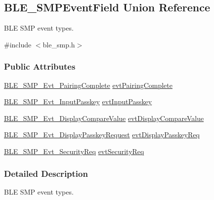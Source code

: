 \hypertarget{union_b_l_e___s_m_p_event_field}{}\subsection{B\+L\+E\+\_\+\+S\+M\+P\+Event\+Field Union Reference}
\label{union_b_l_e___s_m_p_event_field}


B\+LE S\+MP event types.  




{\ttfamily \#include $<$ble\+\_\+smp.\+h$>$}

\subsubsection*{Public Attributes}
\begin{DoxyCompactItemize}
\item 
\hyperlink{struct_b_l_e___s_m_p___evt___pairing_complete}{B\+L\+E\+\_\+\+S\+M\+P\+\_\+\+Evt\+\_\+\+Pairing\+Complete} \hyperlink{union_b_l_e___s_m_p_event_field_a6df1a045125365c56b26a20d7c295cc4}{evt\+Pairing\+Complete}
\item 
\hyperlink{struct_b_l_e___s_m_p___evt___input_passkey}{B\+L\+E\+\_\+\+S\+M\+P\+\_\+\+Evt\+\_\+\+Input\+Passkey} \hyperlink{union_b_l_e___s_m_p_event_field_a29a1fe9fb5de5f81d3e95a8bd779cab0}{evt\+Input\+Passkey}
\item 
\hyperlink{struct_b_l_e___s_m_p___evt___display_compare_value}{B\+L\+E\+\_\+\+S\+M\+P\+\_\+\+Evt\+\_\+\+Display\+Compare\+Value} \hyperlink{union_b_l_e___s_m_p_event_field_a36c9f38eaf73ae61f855cbbd07dd0d88}{evt\+Display\+Compare\+Value}
\item 
\hyperlink{struct_b_l_e___s_m_p___evt___display_passkey_request}{B\+L\+E\+\_\+\+S\+M\+P\+\_\+\+Evt\+\_\+\+Display\+Passkey\+Request} \hyperlink{union_b_l_e___s_m_p_event_field_acd34226ad693477bcf891242d665085f}{evt\+Display\+Passkey\+Req}
\item 
\hyperlink{struct_b_l_e___s_m_p___evt___security_req}{B\+L\+E\+\_\+\+S\+M\+P\+\_\+\+Evt\+\_\+\+Security\+Req} \hyperlink{union_b_l_e___s_m_p_event_field_af79adcfa051287c00ab639d5e66a1301}{evt\+Security\+Req}
\end{DoxyCompactItemize}


\subsubsection{Detailed Description}
B\+LE S\+MP event types. 

